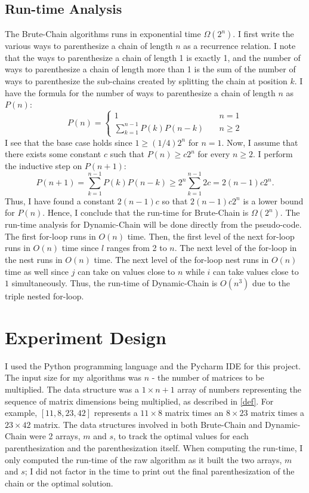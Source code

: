 \documentclass[letterpaper,titlepage]{article}
\begin{document}
\subsection{Run-time Analysis}
The Brute-Chain algorithms runs in exponential time $\Omega(2^n)$. I first write the various ways to parenthesize a chain of length $n$ as a recurrence relation. I note that the ways to parenthesize a chain of length 1 is exactly 1, and the number of ways to parenthesize a chain of length more than 1 is the sum of the number of ways to parenthesize the sub-chains created by splitting the chain at position $k$. I have the formula for the number of ways to parenthesize a chain of length $n$ as $P(n)$:
\begin{equation*}
P(n) = \left\{
        \begin{array}{ll}
           1 & \quad n=1 \\
            \sum_{k=1}^{n-1} P(k)P(n-k) & \quad n \geq 2
        \end{array}
    \right.
\end{equation*}
I see that the base case holds since $1 \geq (1/4)2^n$ for $n=1.$ Now, I assume that there exists some constant $c$ such that $P(n) \geq c2^n$ for every $n \geq 2$. I perform the inductive step on $P(n+1)$:
$$P(n+1) = \sum_{k=1}^{n-1} P(k)P(n-k) \geq 2^n \sum_{k=1}^{n-1} 2c = 2(n-1)c2^n.$$
Thus, I have found a constant $2(n-1)c$ so that $2(n-1)c2^n$ is a lower bound for $P(n)$. Hence, I conclude that the run-time for Brute-Chain is $\Omega(2^n).$
\newline
The run-time analysis for Dynamic-Chain will be done directly from the pseudo-code. The first for-loop runs in $O(n)$ time. Then, the first level of the next for-loop runs in $O(n)$ time since $l$ ranges from 2 to $n$. The next level of the for-loop in the nest runs in $O(n)$ time. The next level of the for-loop nest runs in $O(n)$ time as well since $j$ can take on values close to $n$ while $i$ can take values close to $1$ simultaneously. Thus, the run-time of Dynamic-Chain is $O(n^3)$ due to the triple nested for-loop.

\section{Experiment Design}
I used the Python programming language and the Pycharm IDE for this project. The input size for my algorithms was $n$ - the number of matrices to be multiplied.
The data structure was a $1 \times n+1$ array of numbers representing the sequence of matrix dimensions being multiplied, as described in \ref{def}. For example, $[11,8,23,42]$ represents a $11\times 8$ matrix times an $8 \times 23$ matrix times a $23 \times 42$ matrix. The data structures involved in both Brute-Chain and Dynamic-Chain were 2 arrays, $m$ and $s$, to track the optimal values for each parenthesization and the parenthesization itself. When computing the run-time, I only computed the run-time of the raw algorithm as it built the two arrays, $m$ and $s$; I did not factor in the time to print out the final parenthesization of the chain or the optimal solution.
\end{document}
